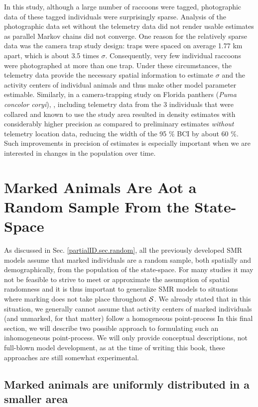 In this study, although a large number of raccoons were tagged,
photographic data of these tagged individuals were surprisingly
sparse. Analysis of the photographic data set without the telemetry
data did not render usable estimates as parallel Markov chains did not
converge. One reason for the relatively sparse data was the camera
trap study design: traps were spaced on average 1.77 km apart, which
is about 3.5 times $\sigma$. Consequently, very few individual
raccoons were photographed at more than one trap. Under these
circumstances, the telemetry data provide the necessary spatial
information to estimate $\sigma$ and the activity centers of
individual animals and thus make other model parameter
estimable. Similarly, in a camera-trapping study on Florida panthers
(\emph{Puma concolor coryi}), \citet{sollmann_etal:inprepjapplecol},
including telemetry data from the 3 individuals that were collared and
known to use the study area resulted in density estimates with
considerably higher precision as compared to preliminary estimates
\emph{without} telemetry location data, reducing the width of the 95
\% BCI by about 60 \%. Such improvements in precision of estimates is
especially important when we are interested in changes in the
population over time.


\section{Marked Animals Are Aot a Random Sample From the State-Space}

As discussed in Sec. \ref{partialID.sec.random}, all the previously
developed SMR models assume that marked individuals are a random
sample, both spatially and demographically, from the population of the
state-space. For many studies it may not be feasible to strive to meet
or approximate the assumption of spatial randomness and it is thus
important to generalize SMR models to situations where marking does
not take place throughout ${\cal S}$. We already stated that in this
situation, we generally cannot assume that activity centers of marked
individuals (and unmarked, for that matter) follow a homogeneous
point-process In this final section, we will describe two possible
approach to formulating such an inhomogeneous point-process. We will
only provide conceptual descriptions, not full-blown model
development, as at the time of writing this book, these approaches are
still somewhat experimental.


\subsection{Marked animals are uniformly distributed in a smaller area}

